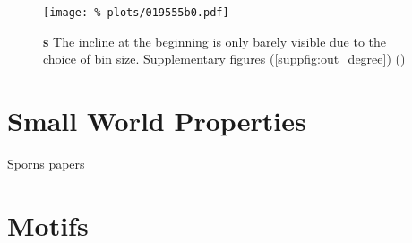 \begin{figure}[H]
  \centering
  \texttt{[image: \%
    plots/019555b0.pdf]}
  \caption{\textbf{s} The incline at the beginning is only barely
    visible due to the choice of bin size. Supplementary figures
    (\autoref{suppfig:out_degree}) ()}
  \label{fig:in_degre_RG_compare}
\end{figure}


\section{Small World Properties}

Sporns papers

\section{Motifs}




